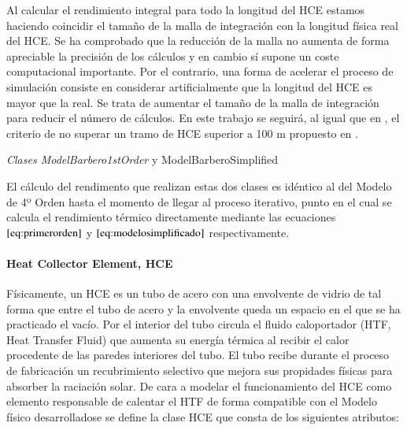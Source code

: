 \documentclass[12pt]{report} %
\begin{document}
Al calcular el rendimiento integral para todo la longitud del HCE estamos haciendo coincidir el tamaño de la malla de integración con la longitud física real del HCE. Se ha comprobado que la reducción de la malla no aumenta de forma apreciable la precisión de los cálculos y en cambio sí supone un coste computacional importante. Por el contrario, una forma de acelerar el proceso de simulación consiste en considerar artificialmente que la longitud del HCE es mayor que la real. Se trata de aumentar el tamaño de la malla de integración para reducir el número de cálculos. En este trabajo se seguirá, al igual que en \cite{1022085/7TD8VTGL}, el criterio de no superar un tramo de HCE superior a 100 m propuesto en \cite{1022085/CYH3NJEG}. 

\emph{Clases ModelBarbero1stOrder} y ModelBarberoSimplified

El cálculo del rendimento que realizan estas dos clases es idéntico al del Modelo de 4º Orden hasta el momento de llegar al proceso iterativo, punto en el cual se calcula el rendimiento térmico directamente mediante las ecuaciones  \(\eqref{eq:primerorden}\) y \(\eqref{eq:modelosimplificado}\) respectivamente.

\hypertarget{heat-collector-element-hce}{\paragraph{Heat Collector Element, HCE}\label{heat-collector-element-hce}}

Físicamente, un HCE es un tubo de acero con una envolvente de vidrio de tal forma que entre el tubo de acero y la envolvente queda un espacio en el que se ha practicado el vacío. Por el interior del tubo circula el fluido caloportador (HTF, Heat Transfer Fluid) que aumenta su energía térmica al recibir el calor procedente de las paredes interiores del tubo. El tubo recibe durante el proceso de fabricación un recubrimiento selectivo que mejora sus propidades físicas para absorber la raciación solar. De cara a modelar el funcionamiento del HCE como elemento responsable de calentar el HTF de forma compatible con el Modelo físico desarrolladose se define la clase HCE que consta de los siguientes atributos:
\end{document}
